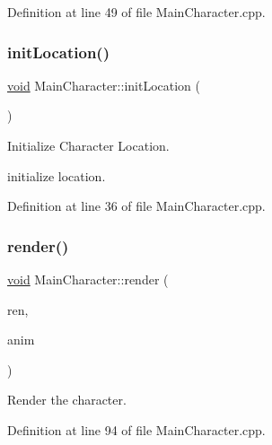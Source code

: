 Definition at line 49 of file Main\+Character.\+cpp.

\mbox{\label{class_main_character_a245e5d6922a50bf19f89eaf93d4c3dbf}} 
\subsubsection{\texorpdfstring{initLocation()}{initLocation()}}
{\footnotesize\ttfamily \mbox{\hyperlink{_s_d_l__opengles2__gl2ext_8h_ae5d8fa23ad07c48bb609509eae494c95}{void}} Main\+Character\+::init\+Location (\begin{DoxyParamCaption}{ }\end{DoxyParamCaption})}



Initialize Character Location. 

initialize location. 

Definition at line 36 of file Main\+Character.\+cpp.

\mbox{\label{class_main_character_adc42e8f1488d22c15eea5e814913e255}} 
\subsubsection{\texorpdfstring{render()}{render()}}
{\footnotesize\ttfamily \mbox{\hyperlink{_s_d_l__opengles2__gl2ext_8h_ae5d8fa23ad07c48bb609509eae494c95}{void}} Main\+Character\+::render (\begin{DoxyParamCaption}\item[{\mbox{\hyperlink{_s_d_l__render_8h_aaf0bf7d020754fc614fe06552ea4d5d4}{S\+D\+L\+\_\+\+Renderer}} $\ast$}]{ren,  }\item[{int}]{anim }\end{DoxyParamCaption})}



Render the character. 



Definition at line 94 of file Main\+Character.\+cpp.

\mbox{\label{class_main_character_a137f161069695697dc2e7359b65d1c06}} 
